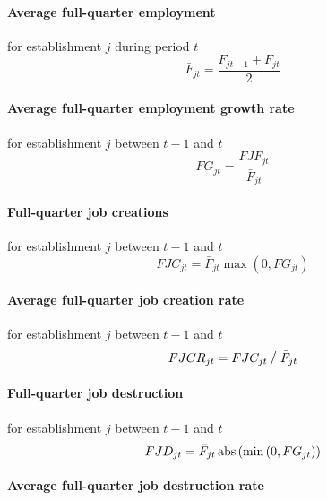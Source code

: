 \paragraph{Average full-quarter employment}

for establishment $j$ during period $t$%
\begin{equation}
\bar{F}_{jt}=\frac{F_{jt-1}+F_{jt}}{2}  \label{eq:Fbarjt}
\end{equation}

\paragraph{Average full-quarter employment growth rate}

for establishment $j$ between $t-1$ and $t$%
\begin{equation}
FG_{jt}=\frac{FJF_{jt}}{\bar{F}_{jt}}  \label{eq:FGjt}
\end{equation}

\paragraph{Full-quarter job creations}

for establishment $j$ between $t-1$ and $t$%
\begin{equation}
FJC_{jt}=\bar{F}_{jt}\max \left( 0,FG_{jt}\right)  \label{eq:FJCjt}
\end{equation}

\paragraph{Average full-quarter job creation rate}

for establishment $j$ between $t-1$ and $t$%
\begin{equation}
FJCR_{jt}={FJC_{jt}\left/ {\vphantom {{JD_{jt} } {\bar {F}_{jt} }}}\right. 
\bar{F}_{jt}}
\end{equation}

\paragraph{Full-quarter job destruction}

for establishment $j$ between $t-1$ and $t$%
\begin{equation}
FJD_{jt}=\bar{F}_{jt}\limfunc{abs}\left( {\min \left( {0,FG_{jt}}\right) }%
\right)
\end{equation}

\paragraph{Average full-quarter job destruction rate}

